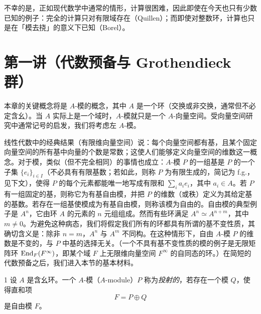 不幸的是，正如现代数学中通常的情形，计算很困难，因此即使在今天也只有少数已知的例子：完全的计算只对有限域存在（Quillen）；而即使对整数环，计算也只是在「模去挠」的意义下已知（Borel）。

\section{第一讲（代数预备与 Grothendieck 群）}

本章的关键概念将是 $A$-模的概念，其中 $A$ 是一个环（交换或非交换，通常但不必定含幺）。当 $A$ 实际上是一个域时，$A$-模就只是一个 $A$-向量空间。受向量空间研究中通常记号的启发，我们将考虑左 $A$-模。

线性代数中的经典结果（有限维向量空间）说：每个向量空间都有基，且某个固定向量空间的所有基中向量的个数是常数；这使人们能够定义向量空间的维数这一概念。对于模，类似（但不完全相同）的事情也成立：$A$-模 $P$ 的一组基是 $P$ 的一个子集 $\{e_i\}_{i \in I}$（不必具有有限基数；若如此，则称 $P$ 为有限生成的，简记为 f.g.，见下文），使得 $P$ 的每个元素都能唯一地写成有限和 $\sum_i a_i e_i$，其中 $a_i \in A$。若 $P$ 有一组固定的基，则称它为有基自由模，并把 $P$ 的维数（或秩）定义为其给定基的基数。若存在一组基使模成为有基自由模，则称该模为自由的。自由模的典型例子是 $A^n$，它由环 $A$ 的元素的 $n$ 元组组成。然而有些环满足 $A^n \simeq A^{n+m}$，其中 $m \ne 0$。为避免这种病态，我们将假定我们所有的环都具有所谓的基不变性质，其确切含义是：除非 $n = m$，$A^n$ 与 $A^m$ 不同构。在这种情形下，自由 $A$-模 $P$ 的维数是不变的，与 $P$ 中基的选择无关。（一个不具有基不变性质的模的例子是无限矩阵环 $\operatorname{End}_F(F^\infty)$，即某个域 $F$ 上无限维向量空间 $F^\infty$ 的自同态的环。）在简短的代数预备之后，我们进入本节的基本材料。

\begin{defn}{1} 设 $A$ 是含幺环。一个 $A$-模（$A$-module）$P$ 称为\emph{投射的}，若存在一个模 $Q$，使得直和项
\[ F = P \oplus Q \]
是自由模 $F$。\end{defn}

